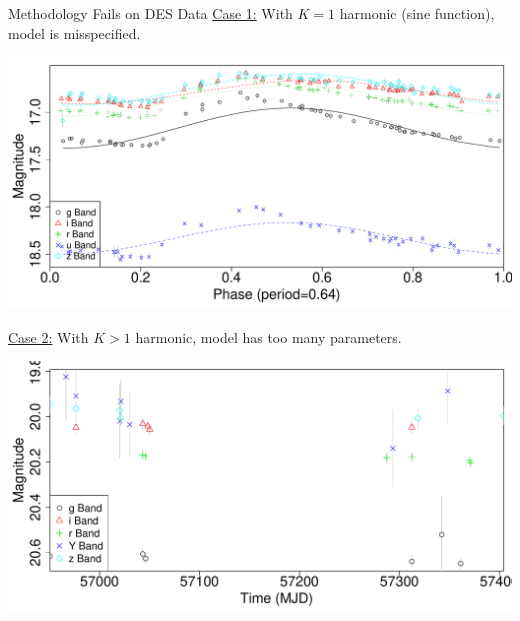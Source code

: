 \documentclass[12pt]{beamer}
\begin{document}




\begin{frame}{Methodology Fails on DES Data}
  \underline{Case 1:} With $K=1$ harmonic (sine function), model is misspecified.
  \begin{center}
    \includegraphics[scale=.2]{figs/rrlyrae_model_fit_sine.pdf}
  \end{center}
  \underline{Case 2:} With $K>1$ harmonic, model has too many parameters.
  \begin{center}
    \includegraphics[scale=0.2]{figs/unfolded_des_351.pdf}
  \end{center}
\end{frame}
\end{document}
